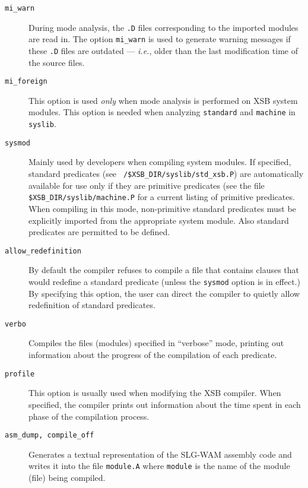 \begin{description}
\item[{\tt mi\_warn}]
	During mode analysis, the {\tt .D} files corresponding to the
	imported modules are read in. The option {\tt mi\_warn} is used
	to generate warning messages if these {\tt .D} files are 
	outdated --- {\em i.e.}, older
	than the last modification time of the source files.

\item[{\tt mi\_foreign}] This option is used {\em only\/} when mode analysis
	is performed on XSB system modules. This option is
	needed when analyzing {\tt standard} and {\tt machine} in
	{\tt syslib}.


\item[{\tt sysmod}] 
	Mainly used by developers when compiling system modules. If
	specified, standard predicates (see {\tt
	/\$XSB\_DIR/syslib/std\_xsb.P}) are automatically available
	for use only if they are primitive predicates (see the file
	{\tt \$XSB\_DIR/syslib/machine.P} for a current listing of
	primitive predicates.  When compiling in this mode,
	non-primitive standard predicates must be explicitly imported
	from the appropriate system module.  Also standard predicates 
	are permitted to be defined.
\item[{\tt allow\_redefinition}] 
	By default the compiler refuses to compile a file that
	contains clauses that would redefine a standard predicate
	(unless the {\tt sysmod} option is in effect.)  By specifying
	this option, the user can direct the compiler to quietly allow
	redefinition of standard predicates.

\item[{\tt verbo}] Compiles the files (modules) specified in ``verbose'' mode, 
	printing out information about the progress of the compilation of each 
	predicate.
\item[{\tt profile}] This option is usually used when modifying the
	XSB compiler.  When specified, the compiler prints out
	information about the time spent in each phase of the
	compilation process.

\item[{\tt asm\_dump, compile\_off}] Generates a textual representation of 
	the SLG-WAM assembly code and writes it into the file {\tt module.A}
	where {\tt module} is the name of the module (file) being compiled.  
	

\end{description}
